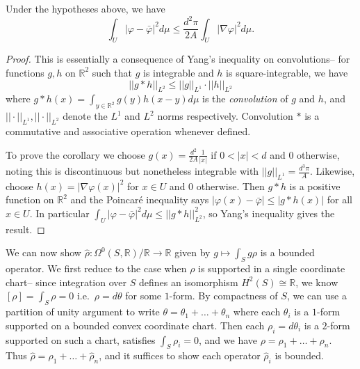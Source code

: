 \begin{corollary}
    \label{cor:poincare-ineq}
    Under the hypotheses above, we have \[\int_U
    |\varphi-\bar\varphi|^2d\mu \leq \frac{d^2\pi}{2A}\int_U|\nabla
    \varphi|^2 d\mu.\]
    \begin{proof}
        This is essentially a consequence of Yang's inequality on convolutions--
        for functions \(g,h\) on \(\mathbb{R}^2\) such that \(g\) is
        integrable and \(h\) is square-integrable, we have
        \[
            ||g\ast h||_{L^2} \leq ||g||_{L^1} \cdot ||h||_{L^2}
        \]
        where \(g\ast h(x)=\int_{y\in \mathbb{R}^2} g(y)h(x-y)d\mu\) is the
        \textit{convolution} of \(g\) and \(h\), and \(||\cdot ||_{L^1},
        ||\cdot ||_{L^2}\) denote the \(L^1\) and \(L^2\) norms respectively.
        Convolution \(\ast\) is a commutative and associative operation
        whenever defined.

        To prove the corollary we choose \(g(x)=\frac{d^2}{2A}\frac{1}{|x|}\) if
        \(0<|x|<d\) and \(0\) otherwise, noting this is
        discontinuous but nonetheless integrable with
        \(||g||_{L^1}=\frac{d^3\pi}{A}.\) Likewise, choose
        \(h(x)=|\nabla \varphi(x)|^2\) for \(x\in U\) and \(0\)
        otherwise. Then \(g\ast h\) is a positive function on
        \(\mathbb{R}^2\) and the Poincar\'e inequality says
        \(|\varphi(x)-\bar\varphi|\leq |g\ast h(x)|\) for all
        \(x\in U\). In particular
        \(\int_U|\varphi-\bar\varphi|^2d\mu\leq ||g\ast h||_{L^2}^2\), so Yang's inequality gives the result.
    \end{proof}
\end{corollary}

We can now show \(\hat\rho:\Omega^0(S,\mathbb{R})/\mathbb{R}\to \mathbb{R}\)
given by \(g\mapsto \int_S g\rho\) is a bounded operator. We first reduce to the
case when \(\rho\) is supported in a single coordinate chart-- since
integration over \(S\) defines an isomorphism \(H^2(S)\cong \mathbb{R}\), we
know \( [\rho]= \int_S\rho =0\) i.e.\ \(\rho=d\theta\) for some \(1\)-form.
By compactness of \(S\), we can use a partition of unity argument to write
\(\theta = \theta_1+\ldots+\theta_n\) where each \(\theta_i\) is a \(1\)-form
supported on a bounded convex coordinate chart. Then each \(\rho_i=d\theta_i\)
is a \(2\)-form supported on such a chart, satisfies \(\int_S\rho_i = 0\), and
we have \(\rho=\rho_1+\ldots+\rho_n\). Thus \(\hat\rho =
\hat\rho_1+\ldots+\hat\rho_n\), and it suffices to show each operator
\(\hat\rho_i\) is bounded.

